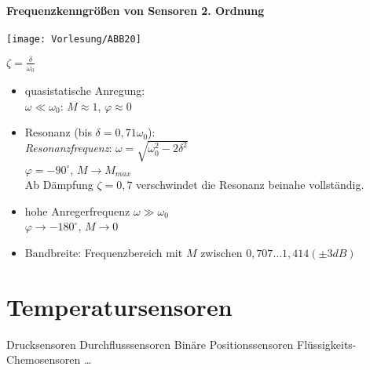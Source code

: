 \documentclass{scrreprt}
\begin{document}
\subsubsection{Frequenzkenngrößen von Sensoren 2. Ordnung}
\begin{center}
\texttt{[image: Vorlesung/ABB20]}
\end{center}
$\zeta = \frac{\delta}{\omega_0}$
\begin{itemize}
\item quasistatische Anregung:\\
$\omega \ll \omega_0$: $M\approx 1$, $\varphi \approx 0$
\item Resonanz (bis $\delta = 0,71 \omega_0$):\\
\emph{Resonanzfrequenz}: $\omega = \sqrt{\omega_0^2-2\delta^2}$\\
$\varphi = -90^\circ$, $M\to M_{max}$\\
Ab Dämpfung $\zeta = 0,7$ verschwindet die Resonanz beinahe vollständig.
\item hohe Anregerfrequenz $\omega \gg \omega_0$\\
$\varphi \to -180^\circ$, $M\to 0$
\item Bandbreite: Frequenzbereich mit $M$ zwischen $0,707\dots 1,414 (\pm 3dB)$
\end{itemize}

\chapter{Temperatursensoren}
Drucksensoren
Durchflusssensoren
Binäre Positionssensoren
Flüssigkeits-Chemosensoren
…
\end{document}
